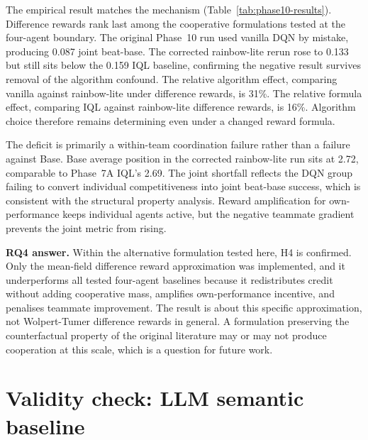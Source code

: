 The empirical result matches the mechanism (Table~\ref{tab:phase10-results}). Difference rewards rank last among the cooperative formulations tested at the four-agent boundary. The original Phase~10 run used vanilla DQN by mistake, producing 0.087 joint beat-base. The corrected rainbow-lite rerun rose to 0.133 but still sits below the 0.159 IQL baseline, confirming the negative result survives removal of the algorithm confound. The relative algorithm effect, comparing vanilla against rainbow-lite under difference rewards, is 31\%. The relative formula effect, comparing IQL against rainbow-lite difference rewards, is 16\%. Algorithm choice therefore remains determining even under a changed reward formula.

The deficit is primarily a within-team coordination failure rather than a failure against Base. Base average position in the corrected rainbow-lite run sits at 2.72, comparable to Phase~7A IQL's 2.69. The joint shortfall reflects the DQN group failing to convert individual competitiveness into joint beat-base success, which is consistent with the structural property analysis. Reward amplification for own-performance keeps individual agents active, but the negative teammate gradient prevents the joint metric from rising.

\textbf{RQ4 answer.} Within the alternative formulation tested here, H4 is confirmed. Only the mean-field difference reward approximation was implemented, and it underperforms all tested four-agent baselines because it redistributes credit without adding cooperative mass, amplifies own-performance incentive, and penalises teammate improvement. The result is about this specific approximation, not Wolpert-Tumer difference rewards in general. A formulation preserving the counterfactual property of the original literature may or may not produce cooperation at this scale, which is a question for future work.

\section{Validity check: LLM semantic baseline}
\label{sec:llm-validity}

